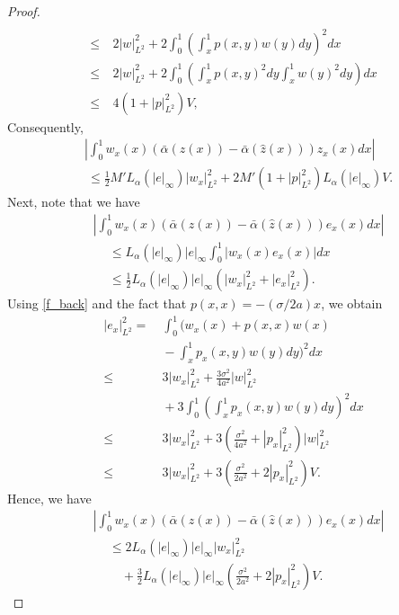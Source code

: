 \documentclass[10pt,a4paper]{amsart}
\begin{document}
\begin{proof}
\begin{align}
\end{align}
\begin{align}
\leq&~ 2|w|_{L^2}^2+2\int_{0}^{1}\left(\int_x^1 p(x,y)w(y)dy\right)^2dx \nonumber\\
\leq&~ 2|w|_{L^2}^2 + 2\int_{0}^{1}\left(\int_{x}^{1}p(x,y)^2dy \int_{x}^{1}w(y)^2dy\right) dx \nonumber\\
\leq&~ 4\left(1+|p|_{L^2}^2\right)V, \label{v_L2}
\end{align}
Consequently, 
\begin{align}
&\left|\int_{0}^{1}w_x(x)\left(\bar{\alpha}(z(x))-\bar{\alpha}(\hat{z}(x))\right)z_x(x)dx\right|\nonumber\\
&~\leq \frac{1}{2}M'L_{\alpha}(|e|_{\infty})|w_x|_{L^2}^2  + 2M'\left(1+|p|_{L^2}^2\right)L_{\alpha}(|e|_{\infty})V.\label{first_2}
\end{align}
Next, note that we have 
\begin{align*}
&\left|\int_{0}^{1}w_x(x)\left(\bar{\alpha}(z(x))-\bar{\alpha}(\hat{z}(x))\right)e_x(x)dx\right| \\
&~\quad \leq L_{\alpha}(|e|_{\infty})|e|_{\infty}\int_{0}^{1}|w_x(x)e_x(x)|dx \\
&~\quad \leq \frac{1}{2}L_{\alpha}(|e|_{\infty})|e|_{\infty}\left(|w_x|_{L^2}^2+|e_x|_{L^2}^2\right).
\end{align*}
Using \eqref{f_back} and the fact that $p(x,x)=-(\sigma/2a)x$, we obtain
\begin{align}
|e_x|_{L^2}^2 =&~ \int_{0}^{1}\bigg(w_x(x) +p(x,x)w(x) \nonumber \\
&~-\int_{x}^1p_x(x,y)w(y)dy\bigg)^2dx\nonumber\\
\leq&~ 3|w_x|_{L^2}^2+\frac{3\sigma^2}{4a^2}|w|_{L^2}^2 \nonumber\\
&~+3\int_{0}^{1}\left(\int_{x}^1p_x(x,y)w(y)dy\right)^2dx \nonumber \\
\leq&~3|w_x|_{L^2}^2+3\left(\frac{\sigma^2}{4a^2}+|p_x|_{L^2}^2\right)|w|_{L^2}^2 \nonumber\\
\leq&~3|w_x|_{L^2}^2+3\left(\frac{\sigma^2}{2a^2}+2|p_x|_{L^2}^2\right)V.\label{vx_L2_B}
\end{align}
Hence, we have 
\begin{align}
&\left|\int_{0}^{1}w_x(x)\left(\bar{\alpha}(z(x))-\bar{\alpha}(\hat{z}(x))\right)e_x(x)dx\right| \nonumber\\
&~\quad \leq 2L_{\alpha}(|e|_{\infty})|e|_{\infty}|w_x|_{L^2}^2 \nonumber\\
&~\quad \quad + \frac{3}{2}L_{\alpha}(|e|_{\infty})|e|_{\infty}\left(\frac{\sigma^2}{2a^2}+2|p_x|_{L^2}^2\right)V.\label{first_3}

\end{align}
\end{proof}
\end{document}
